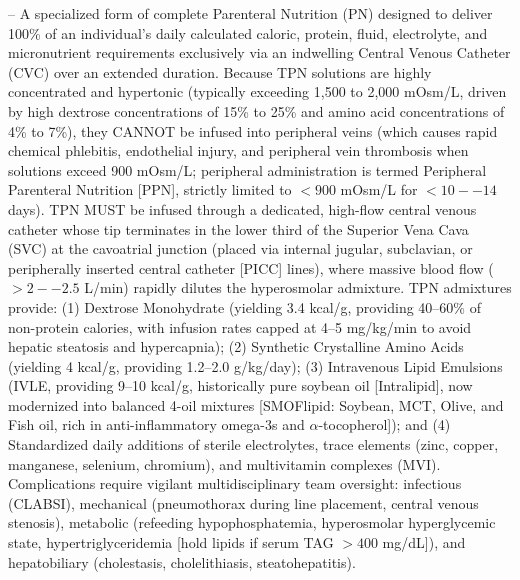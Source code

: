 -- A specialized form of complete Parenteral Nutrition (PN) designed to deliver 100\% of an individual's daily calculated caloric, protein, fluid, electrolyte, and micronutrient requirements exclusively via an indwelling Central Venous Catheter (CVC) over an extended duration. Because TPN solutions are highly concentrated and hypertonic (typically exceeding 1,500 to 2,000 mOsm/L, driven by high dextrose concentrations of 15\% to 25\% and amino acid concentrations of 4\% to 7\%), they CANNOT be infused into peripheral veins (which causes rapid chemical phlebitis, endothelial injury, and peripheral vein thrombosis when solutions exceed 900 mOsm/L; peripheral administration is termed Peripheral Parenteral Nutrition [PPN], strictly limited to $<900$ mOsm/L for $<10--14$ days). TPN MUST be infused through a dedicated, high-flow central venous catheter whose tip terminates in the lower third of the Superior Vena Cava (SVC) at the cavoatrial junction (placed via internal jugular, subclavian, or peripherally inserted central catheter [PICC] lines), where massive blood flow ($>2--2.5$ L/min) rapidly dilutes the hyperosmolar admixture. TPN admixtures provide: (1) Dextrose Monohydrate (yielding 3.4 kcal/g, providing 40--60\% of non-protein calories, with infusion rates capped at 4--5 mg/kg/min to avoid hepatic steatosis and hypercapnia); (2) Synthetic Crystalline Amino Acids (yielding 4 kcal/g, providing 1.2--2.0 g/kg/day); (3) Intravenous Lipid Emulsions (IVLE, providing 9--10 kcal/g, historically pure soybean oil [Intralipid], now modernized into balanced 4-oil mixtures [SMOFlipid: Soybean, MCT, Olive, and Fish oil, rich in anti-inflammatory omega-3s and $\alpha$-tocopherol]); and (4) Standardized daily additions of sterile electrolytes, trace elements (zinc, copper, manganese, selenium, chromium), and multivitamin complexes (MVI). Complications require vigilant multidisciplinary team oversight: infectious (CLABSI), mechanical (pneumothorax during line placement, central venous stenosis), metabolic (refeeding hypophosphatemia, hyperosmolar hyperglycemic state, hypertriglyceridemia [hold lipids if serum TAG $>400$ mg/dL]), and hepatobiliary (cholestasis, cholelithiasis, steatohepatitis).

